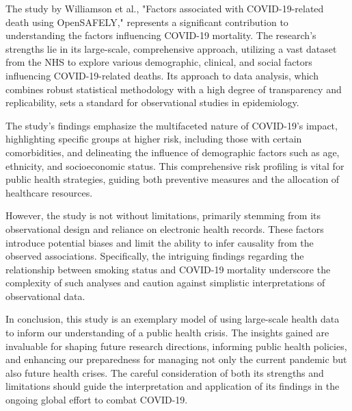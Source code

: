 \documentclass{article}
\begin{document}
The study by Williamson et al., "Factors associated with COVID-19-related death using OpenSAFELY," represents a significant contribution to understanding the factors influencing COVID-19 mortality. The research's strengths lie in its large-scale, comprehensive approach, utilizing a vast dataset from the NHS to explore various demographic, clinical, and social factors influencing COVID-19-related deaths. Its approach to data analysis, which combines robust statistical methodology with a high degree of transparency and replicability, sets a standard for observational studies in epidemiology.

The study's findings emphasize the multifaceted nature of COVID-19's impact, highlighting specific groups at higher risk, including those with certain comorbidities, and delineating the influence of demographic factors such as age, ethnicity, and socioeconomic status. This comprehensive risk profiling is vital for public health strategies, guiding both preventive measures and the allocation of healthcare resources.

However, the study is not without limitations, primarily stemming from its observational design and reliance on electronic health records. These factors introduce potential biases and limit the ability to infer causality from the observed associations. Specifically, the intriguing findings regarding the relationship between smoking status and COVID-19 mortality underscore the complexity of such analyses and caution against simplistic interpretations of observational data.

In conclusion, this study is an exemplary model of using large-scale health data to inform our understanding of a public health crisis. The insights gained are invaluable for shaping future research directions, informing public health policies, and enhancing our preparedness for managing not only the current pandemic but also future health crises. The careful consideration of both its strengths and limitations should guide the interpretation and application of its findings in the ongoing global effort to combat COVID-19.


\end{document}

